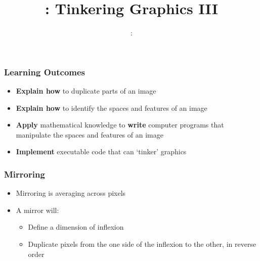 \usepackage{../../beamerthemeFalmouthGamesAcademy}
\usepackage{multimedia}
\graphicspath{ {../../} }


\usepackage[normalem]{ulem}
\usepackage{wasysym}

\usepackage{pdfpages}

\usetikzlibrary{arrows,automata}







\title{\sessionnumber: Tinkering Graphics III}
\subtitle{\modulecode: \moduletitle}

\frame{\titlepage} 

\begin{frame}
	\frametitle{Learning Outcomes}
	\begin{itemize}
		\item \textbf{Explain how} to duplicate parts of an image
		\item \textbf{Explain how} to identify the spaces and features of an image
		\item \textbf{Apply} mathematical knowledge to \textbf{write} computer programs that manipulate the spaces and features of an image
		\item \textbf{Implement} executable code that can `tinker' graphics
	\end{itemize}
\end{frame}


\begin{frame}
	\frametitle{Mirroring}
	
	\begin{itemize}		
		\item Mirroring is averaging across pixels
		\item A mirror will:
		\begin{itemize}
			\item Define a dimension of inflexion
			\item Duplicate pixels from the one side of the inflexion to the other, in reverse order
		\end{itemize}	
	\end{itemize}
\end{frame}


